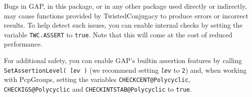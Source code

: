 \documentclass[a4paper,11pt]{report}
\begin{document}
{{ 

 

 Bugs in \textsf{GAP}, in this package, or in any other package used directly or indirectly, may
cause functions provided by \textsf{TwistedConjugacy} to produce errors or incorrect results. To help detect such issues, you can
enable internal checks by setting the variable \texttt{TWC.ASSERT} to \texttt{true}. Note that this will come at the cost of reduced performance. 

 

 

 For additional safety, you can enable \textsf{GAP}'s built\texttt{}in assertion features by calling \texttt{SetAssertionLevel( \mbox{\texttt{\mdseries\slshape lev}} )} (we recommend setting \mbox{\texttt{\mdseries\slshape lev}} to \texttt{2}) and, when working with PcpGroups, setting the variables \texttt{CHECK{\textunderscore}CENT@Polycyclic}, \texttt{CHECK{\textunderscore}IGS@Polycyclic} and \texttt{CHECK{\textunderscore}INTSTAB@Polycyclic} to \texttt{true}. }

 }

   
\end{document}
